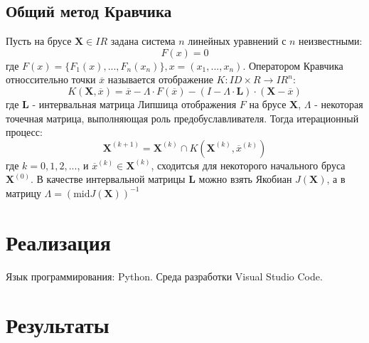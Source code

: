 \documentclass[a4paper,12pt]{article}
\begin{document}
    \subsection{Общий метод Кравчика}
    Пусть на брусе $ \textbf{X} \in IR $ задана система $ n $ линейных уравнений с $ n $ неизвестными:
    \begin{equation}
        F(x) = 0
    \end{equation}
    где $ F(x) = \{F_{1}(x), ..., F_{n}(x_{n})\}, x = (x_{1}, ..., x_{n}) $.
    Оператором Кравчика относсительно точки $ \overline{x} $ называется отображение $ K : ID \times R \to IR^{n} $:
    \begin{equation}
        K(\textbf{X}, \overline{x}) = \overline{x} - \Lambda \cdot F(\overline{x}) - (I - \Lambda \cdot \textbf{L}) \cdot (\textbf{X} - \overline{x})
    \end{equation}
    где $ \textbf{L} $ - интервальная матрица Липшица отображения $ F $ на брусе $ \textbf{X} $, $ \Lambda $ - некоторая точечная матрица, выполняющая роль предобуславливателя.\newline
    Тогда итерационный процесс:
    \begin{equation}
        \textbf{X}^{(k+1)} = \textbf{X}^{(k)} \cap K(\textbf{X}^{(k)}, \overline{x}^{(k)})
    \end{equation}
    где $ k = 0, 1, 2,...$, и $ \overline{x}^{(k)} \in \textbf{X}^{(k)} $, сходитсья для некоторого начального бруса $ \textbf{X}^{(0)} $.\newline
    В качестве интервальной матрицы $ \textbf{L} $ можно взять Якобиан $ J(\textbf{X}) $, а в матрицу $ \Lambda = (\text{mid}J(\textbf{X}))^{-1} $

    \section{Реализация}
    Язык программирования: Python. Среда разработки Visual Studio Code.

    \section{Результаты}
\end{document}
